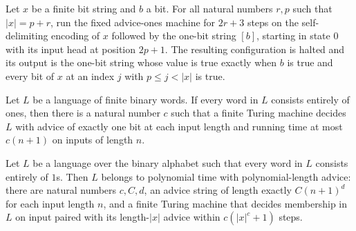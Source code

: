 \begin{lemma}
\label{Complexity.ao_scan}
\leanok
{}
Let $x$ be a finite bit string and $b$ a bit. For all natural numbers $r,p$ such that
$|x|=p+r$, run the fixed advice-ones machine for $2r+3$ steps on the self-delimiting
encoding of $x$ followed by the one-bit string $[b]$, starting in state $0$ with its
input head at position $2p+1$. The resulting configuration is halted and its output is
the one-bit string whose value is true exactly when $b$ is true and every bit of $x$ at
an index $j$ with $p\le j<|x|$ is true.
\end{lemma}

\begin{theorem}
\label{Complexity.mem_DTIMEAdvice_one_of_le_allOnes}
\leanok
{}
Let $L$ be a language of finite binary words. If every word in $L$ consists entirely of
ones, then there is a natural number $c$ such that a finite Turing machine decides $L$
with advice of exactly one bit at each input length and running time at most $c(n+1)$ on
inputs of length $n$.
\end{theorem}

\begin{theorem}
\label{Complexity.mem_PAdvicePoly_of_le_allOnes}
\leanok
{}
Let $L$ be a language over the binary alphabet such that every word in $L$ consists
entirely of $1$s. Then $L$ belongs to polynomial time with polynomial-length advice:
there are natural numbers $c,C,d$, an advice string of length exactly $C(n+1)^d$ for
each input length $n$, and a finite Turing machine that decides membership in $L$ on
input paired with its length-$|x|$ advice within $c(|x|^c+1)$ steps.
\end{theorem}

